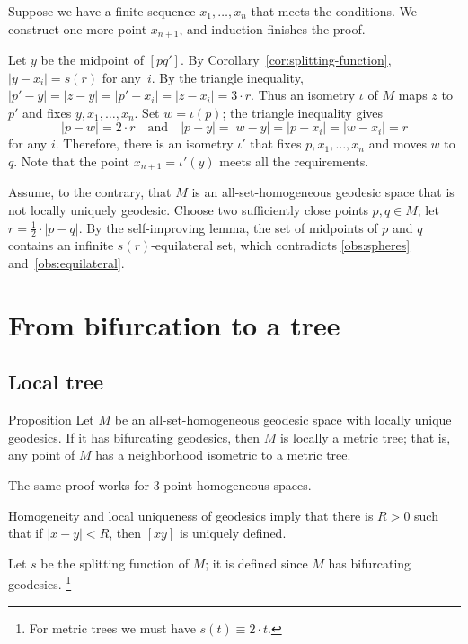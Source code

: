 \documentclass[leqno,a4paper,10pt]{article}
\begin{document}
Suppose we have a finite sequence $x_1,\ldots,x_n$ that meets the conditions.
We construct one more point $x_{n+1}$, and induction finishes the proof.

Let $y$ be the midpoint of $[pq']$.
By Corollary~\ref{cor:splitting-function}, $|y-x_i|=s(r)$ for any~$i$.
By the triangle inequality, $|p'-y|=|z-y|=|p'-x_i|=|z-x_i|=3\cdot r$.
Thus an isometry $\iota$ of $M$ maps $z$ to $p'$ and fixes $y,x_1,\ldots,x_n$.
Set $w=\iota(p)$;
the triangle inequality gives
\[|p-w|=2\cdot r
\quad\text{and}\quad
|p-y|=|w-y|=|p-x_i|=|w-x_i|= r\]
for any $i$.
Therefore, there is an isometry $\iota'$ that fixes $p,x_1,\ldots,x_n$ and moves $w$ to $q$.
Note that the point $x_{n+1}=\iota'(y)$ meets all the requirements.
\qeds


Assume, to the contrary, that $M$ is an all-set-homogeneous geodesic space that is not locally uniquely geodesic.
Choose two sufficiently close points $p,q\in M$;
let $r=\tfrac12\cdot|p-q|$.
By the self-improving lemma, the set of midpoints of $p$ and $q$ contains an infinite $s(r)$-equilateral set,
which contradicts \ref{obs:spheres} and~\ref{obs:equilateral}.
\qeds

\section{From bifurcation to a tree}\label{sec:locally unique geodesics}

\subsection*{Local tree}

\begin{thm}{Proposition}\label{prop:loc-tree}
Let $M$ be an all-set-homogeneous geodesic space with locally unique geodesics.
If it has bifurcating geodesics, then $M$ is locally a metric tree;
that is, any point of $M$ has a neighborhood isometric to a metric tree.
\end{thm}

The same proof works for $3$-point-homogeneous spaces.

Homogeneity and local uniqueness of geodesics imply that there is $R>0$ such that if $|x-y|<R$, then $[xy]$ is uniquely defined.

Let $s$ be the splitting function of $M$; it is defined since $M$ has bifurcating geodesics.%
\footnote{For metric trees we must have $s(t)\equiv2\cdot t$.}
\end{document}
